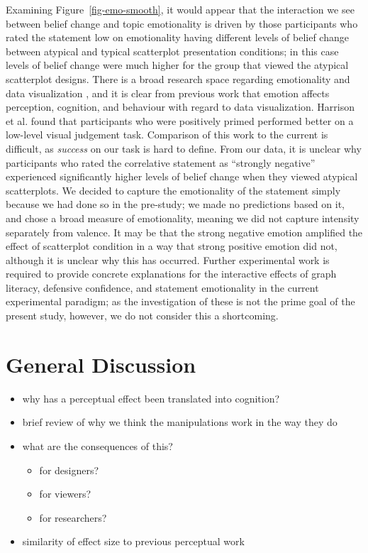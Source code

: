 \documentclass[manuscript,screen,review]{acmart}
\providecommand{\tightlist}{%
  \setlength{\itemsep}{0pt}\setlength{\parskip}{0pt}}\usepackage{longtable,booktabs,array}
\begin{document}
Examining Figure~\ref{fig-emo-smooth}, it would appear that the
interaction we see between belief change and topic emotionality is
driven by those participants who rated the statement low on emotionality
having different levels of belief change between atypical and typical
scatterplot presentation conditions; in this case levels of belief
change were much higher for the group that viewed the atypical
scatterplot designs. There is a broad research space regarding
emotionality and data visualization \citep{lan_2023}, and it is clear
from previous work that emotion affects perception, cognition, and
behaviour \citep{phelps_2006, harrison_2013, thoresen_2016} with regard
to data visualization. Harrison et al. \citep{harrison_2013} found that
participants who were positively primed performed better on a low-level
visual judgement task. Comparison of this work to the current is
difficult, as \emph{success} on our task is hard to define. From our
data, it is unclear why participants who rated the correlative statement
as ``strongly negative'' experienced significantly higher levels of
belief change when they viewed atypical scatterplots. We decided to
capture the emotionality of the statement simply because we had done so
in the pre-study; we made no predictions based on it, and chose a broad
measure of emotionality, meaning we did not capture intensity separately
from valence. It may be that the strong negative emotion amplified the
effect of scatterplot condition in a way that strong positive emotion
did not, although it is unclear why this has occurred. Further
experimental work is required to provide concrete explanations for the
interactive effects of graph literacy, defensive confidence, and
statement emotionality in the current experimental paradigm; as the
investigation of these is not the prime goal of the present study,
however, we do not consider this a shortcoming.

\section{General Discussion}\label{sec-general-discussion}

\begin{itemize}
\tightlist
\item
  why has a perceptual effect been translated into cognition?
\item
  brief review of why we think the manipulations work in the way they do
\item
  what are the consequences of this?

  \begin{itemize}
  \tightlist
  \item
    for designers?
  \item
    for viewers?
  \item
    for researchers?
  \end{itemize}
\item
  similarity of effect size to previous perceptual work
\end{itemize}
\end{document}
